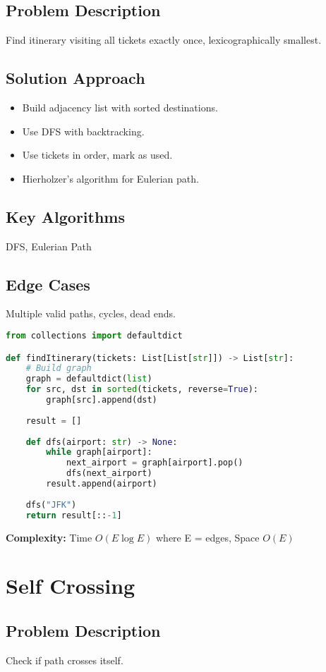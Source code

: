 \documentclass[10pt, a4paper]{article}
\begin{document}
\subsection*{Problem Description}
Find itinerary visiting all tickets exactly once, lexicographically smallest.

\subsection*{Solution Approach}
\begin{itemize}
    \item Build adjacency list with sorted destinations.
    \item Use DFS with backtracking.
    \item Use tickets in order, mark as used.
    \item Hierholzer's algorithm for Eulerian path.
\end{itemize}

\subsection*{Key Algorithms}
DFS, Eulerian Path

\subsection*{Edge Cases}
Multiple valid paths, cycles, dead ends.

\begin{lstlisting}[language=Python]
from collections import defaultdict

def findItinerary(tickets: List[List[str]]) -> List[str]:
    # Build graph
    graph = defaultdict(list)
    for src, dst in sorted(tickets, reverse=True):
        graph[src].append(dst)
    
    result = []
    
    def dfs(airport: str) -> None:
        while graph[airport]:
            next_airport = graph[airport].pop()
            dfs(next_airport)
        result.append(airport)
    
    dfs("JFK")
    return result[::-1]
\end{lstlisting}
\textbf{Complexity:} Time $O(E \log E)$ where E = edges, Space $O(E)$

\section{Self Crossing}
\subsection*{Problem Description}
Check if path crosses itself.
\end{document}

